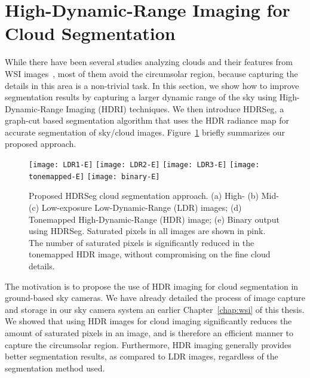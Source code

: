 \section{High-Dynamic-Range Imaging for Cloud Segmentation}
\label{sec:HDRI-segment}
While there have been several studies analyzing clouds and their features from WSI images~\cite{Long,Souza,Li2011,LiuSP2015,ICIP1_2014}, most of them avoid the circumsolar region, because capturing the details in this area is a non-trivial task. In this section, we show how to improve segmentation results by capturing a larger dynamic range of the sky using High-Dynamic-Range Imaging (HDRI) techniques. We then introduce HDRSeg, a graph-cut based segmentation algorithm that uses the HDR radiance map for accurate segmentation of sky/cloud images. Figure~\ref{fig:story-HDRSeg} briefly summarizes our proposed approach.

\begin{figure}[htb]
\centering
\texttt{[image: LDR1-E]}\hspace{0.5mm}    
\texttt{[image: LDR2-E]}\hspace{0.5mm} 
\texttt{[image: LDR3-E]}\hspace{0.5mm}
\texttt{[image: tonemapped-E]}\hspace{0.5mm}
\texttt{[image: binary-E]}\hspace{0.5mm}\\
\caption[Proposed HDRSeg cloud segmentation approach.]{Proposed HDRSeg cloud segmentation approach. (a) High- (b) Mid- (c) Low-exposure Low-Dynamic-Range (LDR) images; (d) Tonemapped High-Dynamic-Range (HDR) image; (e) Binary output using HDRSeg. Saturated pixels in all images are shown in pink. The number of saturated pixels is significantly reduced in the tonemapped HDR image, without compromising on the fine cloud details.}
\label{fig:story-HDRSeg}
\end{figure}


The motivation is to propose the use of HDR imaging for cloud segmentation in ground-based sky cameras. We have already detailed the process of image capture and storage in our sky camera system an earlier Chapter~\ref{chap:wsi} of this thesis. We showed that using HDR images for cloud imaging significantly reduces the amount of saturated pixels in an image, and is therefore an efficient manner to capture the circumsolar region. Furthermore, HDR imaging generally provides better segmentation results, as compared to LDR images, regardless of the segmentation method used.



